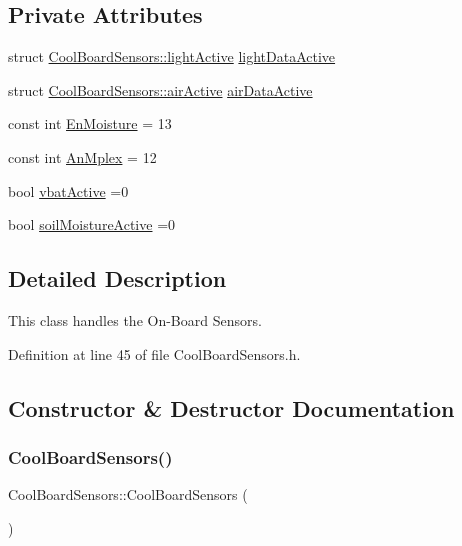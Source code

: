 \subsection*{Private Attributes}
\begin{DoxyCompactItemize}
\item 
struct \hyperlink{struct_cool_board_sensors_1_1light_active}{Cool\+Board\+Sensors\+::light\+Active} \hyperlink{class_cool_board_sensors_ac4deb1cf41bac8b91c780c92fab00ba4}{light\+Data\+Active}
\item 
struct \hyperlink{struct_cool_board_sensors_1_1air_active}{Cool\+Board\+Sensors\+::air\+Active} \hyperlink{class_cool_board_sensors_abff8dfeccb2f7689847bb64d5f1cd31e}{air\+Data\+Active}
\item 
const int \hyperlink{class_cool_board_sensors_a6177d02e14a057a2f171a2e930b5038d}{En\+Moisture} = 13
\item 
const int \hyperlink{class_cool_board_sensors_a12ef28b1046219e0aee10bf64e28c4a5}{An\+Mplex} = 12
\item 
bool \hyperlink{class_cool_board_sensors_ab0b4bbae83796b52b90f91008d383583}{vbat\+Active} =0
\item 
bool \hyperlink{class_cool_board_sensors_ae7971bf527781ac4994309591b78ab89}{soil\+Moisture\+Active} =0
\end{DoxyCompactItemize}


\subsection{Detailed Description}
This class handles the On-\/\+Board Sensors. 

Definition at line 45 of file Cool\+Board\+Sensors.\+h.



\subsection{Constructor \& Destructor Documentation}
\mbox{\label{class_cool_board_sensors_a91ff2a02f5486f90cf2413a1cf8a9ed4}} 
\subsubsection{\texorpdfstring{Cool\+Board\+Sensors()}{CoolBoardSensors()}}
{\footnotesize\ttfamily Cool\+Board\+Sensors\+::\+Cool\+Board\+Sensors (\begin{DoxyParamCaption}{ }\end{DoxyParamCaption})}

